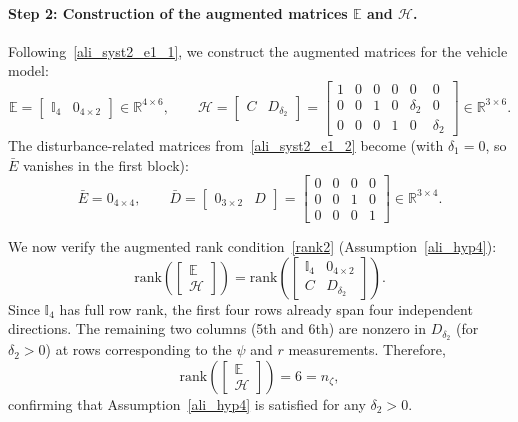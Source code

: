 \paragraph{Step 2: Construction of the augmented matrices $\mathbb{E}$ and $\mathcal{H}$.}
Following~\eqref{ali_syst2_e1_1}, we construct the augmented matrices for the vehicle model:
\begin{equation}\label{eq:vehicle_E_H}
\mathbb{E} = \begin{bmatrix} \mathbb{I}_{4} & 0_{4\times 2} \end{bmatrix} \in \mathbb{R}^{4\times 6}, \qquad
\mathcal{H} = \begin{bmatrix} C & D_{\delta_2} \end{bmatrix} = 
\begin{bmatrix}
1 & 0 & 0 & 0 & 0 & 0 \\
0 & 0 & 1 & 0 & \delta_2 & 0 \\
0 & 0 & 0 & 1 & 0 & \delta_2
\end{bmatrix} \in \mathbb{R}^{3\times 6}.
\end{equation}
The disturbance-related matrices from~\eqref{ali_syst2_e1_2} become (with $\delta_1=0$, so $\bar{E}$ vanishes in the first block):
\begin{equation}
\bar{E} = 0_{4\times 4}, \qquad
\bar{D} = \begin{bmatrix} 0_{3\times 2} & D \end{bmatrix} = 
\begin{bmatrix}
0 & 0 & 0 & 0 \\
0 & 0 & 1 & 0 \\
0 & 0 & 0 & 1
\end{bmatrix} \in \mathbb{R}^{3\times 4}.
\end{equation}

We now verify the augmented rank condition~\eqref{rank2} (Assumption~\ref{ali_hyp4}):
\begin{equation}
\mathrm{rank}\!\left(
\begin{bmatrix} \mathbb{E} \\ \mathcal{H} \end{bmatrix}
\right)
=
\mathrm{rank}\!\left(
\begin{bmatrix}
\mathbb{I}_{4} & 0_{4\times 2} \\[2pt]
C & D_{\delta_2}
\end{bmatrix}
\right).
\end{equation}
Since $\mathbb{I}_4$ has full row rank, the first four rows already span four independent directions. The remaining two columns (5th and 6th) are nonzero in $D_{\delta_2}$ (for $\delta_2>0$) at rows corresponding to the $\psi$ and $r$ measurements. Therefore,
\[
\mathrm{rank}\!\left(
\begin{bmatrix} \mathbb{E} \\ \mathcal{H} \end{bmatrix}
\right) = 6 = n_\zeta,
\]
confirming that Assumption~\ref{ali_hyp4} is satisfied for any $\delta_2>0$.

